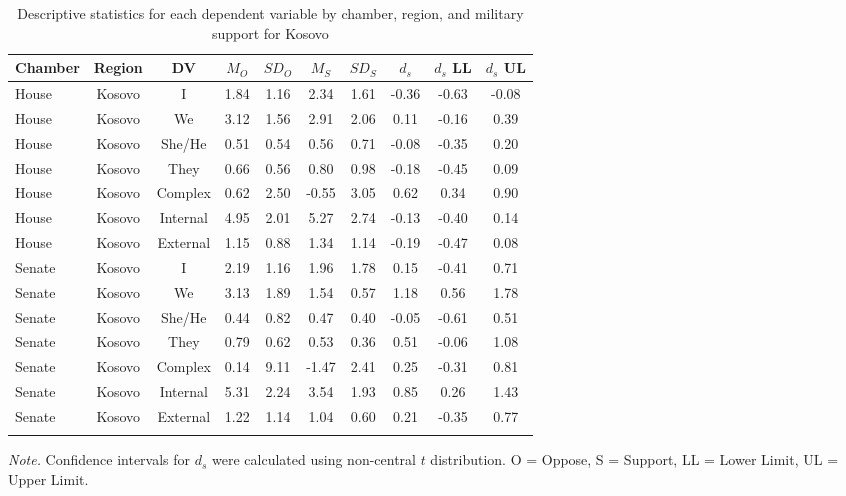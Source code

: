 \documentclass[english,,man,floatsintext]{apa6}
\begin{document}
\begin{table}[tbp]
\begin{center}
\begin{threeparttable}
\caption{\label{tab:Ktable}Descriptive statistics for each dependent variable by chamber, 
          region, and military support for Kosovo}
\small{
\begin{tabular}{lccccccccc}
\toprule
Chamber & Region & DV & $M_O$ & $SD_O$ & $M_S$ & $SD_S$ & $d_s$ & $d_s$ LL & $d_s$ UL\\
\midrule
House & Kosovo & I & 1.84 & 1.16 & 2.34 & 1.61 & -0.36 & -0.63 & -0.08\\
House & Kosovo & We & 3.12 & 1.56 & 2.91 & 2.06 & 0.11 & -0.16 & 0.39\\
House & Kosovo & She/He & 0.51 & 0.54 & 0.56 & 0.71 & -0.08 & -0.35 & 0.20\\
House & Kosovo & They & 0.66 & 0.56 & 0.80 & 0.98 & -0.18 & -0.45 & 0.09\\
House & Kosovo & Complex & 0.62 & 2.50 & -0.55 & 3.05 & 0.62 & 0.34 & 0.90\\
House & Kosovo & Internal & 4.95 & 2.01 & 5.27 & 2.74 & -0.13 & -0.40 & 0.14\\
House & Kosovo & External & 1.15 & 0.88 & 1.34 & 1.14 & -0.19 & -0.47 & 0.08\\
Senate & Kosovo & I & 2.19 & 1.16 & 1.96 & 1.78 & 0.15 & -0.41 & 0.71\\
Senate & Kosovo & We & 3.13 & 1.89 & 1.54 & 0.57 & 1.18 & 0.56 & 1.78\\
Senate & Kosovo & She/He & 0.44 & 0.82 & 0.47 & 0.40 & -0.05 & -0.61 & 0.51\\
Senate & Kosovo & They & 0.79 & 0.62 & 0.53 & 0.36 & 0.51 & -0.06 & 1.08\\
Senate & Kosovo & Complex & 0.14 & 9.11 & -1.47 & 2.41 & 0.25 & -0.31 & 0.81\\
Senate & Kosovo & Internal & 5.31 & 2.24 & 3.54 & 1.93 & 0.85 & 0.26 & 1.43\\
Senate & Kosovo & External & 1.22 & 1.14 & 1.04 & 0.60 & 0.21 & -0.35 & 0.77\\
\bottomrule
\addlinespace
\end{tabular}
}
\begin{tablenotes}[para]
\normalsize{\textit{Note.} Confidence intervals for $d_s$ were calculated using 
          non-central $t$ distribution. O = Oppose, S = Support, LL = Lower Limit, UL = Upper Limit.}
\end{tablenotes}
\end{threeparttable}
\end{center}
\end{table}
\end{document}
